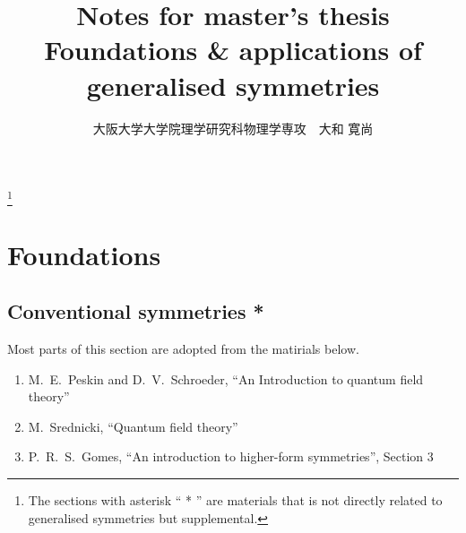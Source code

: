 \documentclass{article}
\title{{\large {\bf Notes for master's thesis}}\\{\bf Foundations \& applications of generalised symmetries}}
\author{大阪大学大学院理学研究科物理学専攻　大和 寛尚}
\date{}
\theoremstyle{definition}
\numberwithin{equation}{section}
\begin{document}
\maketitle

\tableofcontents
\footnote{The sections with asterisk `` * '' are materials that is not directly related to generalised symmetries but supplemental.}

\section{Foundations}
\subsection{Conventional symmetries *}
Most parts of this section are adopted from the matirials below.
\begin{enumerate}
\item [\cite{Peskin:1995ev}]
M.~E.~Peskin and D.~V.~Schroeder,
``An Introduction to quantum field theory''
\item [\cite{Srednicki:2007qs}]
M.~Srednicki,
``Quantum field theory''
\item [\cite{Gomes:2023ahz}]
P.~R.~S.~Gomes,
``An introduction to higher-form symmetries'', Section 3
\end{enumerate}
\end{document}
